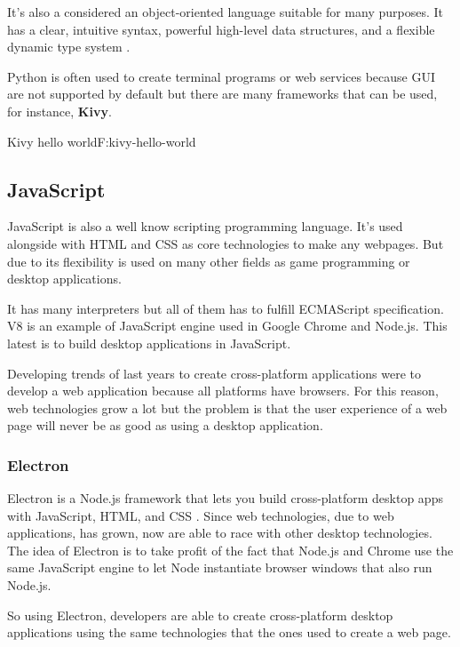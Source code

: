 It's also a considered an object-oriented language suitable for many purposes.
It has a clear, intuitive syntax, powerful high-level data structures, and a
flexible dynamic type system \cite{An93pythonfor}.

Python is often used to create terminal programs or web services because GUI
are not supported by default but there are many frameworks that can be used,
for instance, \textbf{Kivy}.

\begin{codefigure}{Kivy hello world}{F:kivy-hello-world}
\end{codefigure}

\subsection{JavaScript}

JavaScript is also a well know scripting programming language. It's used
alongside with HTML and CSS as core technologies to make any webpages. But due
to its flexibility is used on many other fields as game programming or desktop
applications.

It has many interpreters but all of them has to fulfill ECMAScript 
specification. V8 is an example of JavaScript engine used in Google Chrome and
Node.js. This latest is to build desktop applications in JavaScript.

Developing trends of last years to create cross-platform applications were to 
develop a web application because all platforms have browsers. For this reason,
web technologies grow a lot but the problem is that the user experience of a
web page will never be as good as using a desktop application.

\subsubsection{Electron}

Electron is a Node.js framework that lets you build cross-platform desktop apps
with JavaScript, HTML, and CSS \cite{electron-web}. Since web technologies, due
to web applications, has grown, now are able to race with other desktop
technologies. The idea of Electron is to take profit of the fact that Node.js
and Chrome use the same JavaScript engine to let Node instantiate browser
windows that also run Node.js.

So using Electron, developers are able to create cross-platform desktop 
applications using the same technologies that the ones used to create a web
page.

